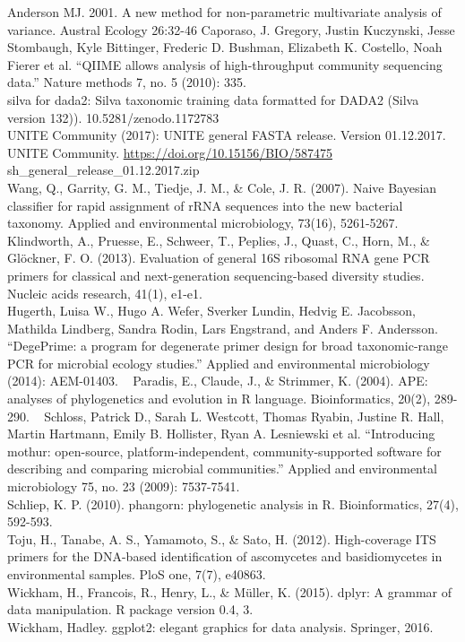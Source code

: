 \documentclass[11pt,]{article}
\begin{document}
Anderson MJ. 2001. A new method for non-parametric multivariate analysis
of variance. Austral Ecology 26:32-46 Caporaso, J. Gregory, Justin
Kuczynski, Jesse Stombaugh, Kyle Bittinger, Frederic D. Bushman,
Elizabeth K. Costello, Noah Fierer et al. ``QIIME allows analysis of
high-throughput community sequencing data.'' Nature methods 7, no. 5
(2010): 335. ~\\
silva for dada2: Silva taxonomic training data formatted for DADA2
(Silva version 132)). 10.5281/zenodo.1172783 ~\\
UNITE Community (2017): UNITE general FASTA release. Version 01.12.2017.
UNITE Community. \url{https://doi.org/10.15156/BIO/587475}
sh\_general\_release\_01.12.2017.zip ~\\
Wang, Q., Garrity, G. M., Tiedje, J. M., \& Cole, J. R. (2007). Naive
Bayesian classifier for rapid assignment of rRNA sequences into the new
bacterial taxonomy. Applied and environmental microbiology, 73(16),
5261-5267. ~\\
Klindworth, A., Pruesse, E., Schweer, T., Peplies, J., Quast, C., Horn,
M., \& Glöckner, F. O. (2013). Evaluation of general 16S ribosomal RNA
gene PCR primers for classical and next-generation sequencing-based
diversity studies. Nucleic acids research, 41(1), e1-e1. ~\\
Hugerth, Luisa W., Hugo A. Wefer, Sverker Lundin, Hedvig E. Jacobsson,
Mathilda Lindberg, Sandra Rodin, Lars Engstrand, and Anders F.
Andersson. ``DegePrime: a program for degenerate primer design for broad
taxonomic-range PCR for microbial ecology studies.'' Applied and
environmental microbiology (2014): AEM-01403. ~ Paradis, E., Claude, J.,
\& Strimmer, K. (2004). APE: analyses of phylogenetics and evolution in
R language. Bioinformatics, 20(2), 289-290. ~ Schloss, Patrick D., Sarah
L. Westcott, Thomas Ryabin, Justine R. Hall, Martin Hartmann, Emily B.
Hollister, Ryan A. Lesniewski et al. ``Introducing mothur: open-source,
platform-independent, community-supported software for describing and
comparing microbial communities.'' Applied and environmental
microbiology 75, no. 23 (2009): 7537-7541. ~\\
Schliep, K. P. (2010). phangorn: phylogenetic analysis in R.
Bioinformatics, 27(4), 592-593. ~\\
Toju, H., Tanabe, A. S., Yamamoto, S., \& Sato, H. (2012). High-coverage
ITS primers for the DNA-based identification of ascomycetes and
basidiomycetes in environmental samples. PloS one, 7(7), e40863. ~\\
Wickham, H., Francois, R., Henry, L., \& Müller, K. (2015). dplyr: A
grammar of data manipulation. R package version 0.4, 3. ~\\
Wickham, Hadley. ggplot2: elegant graphics for data analysis. Springer,
2016.




\newpage
\singlespacing 
\end{document}
